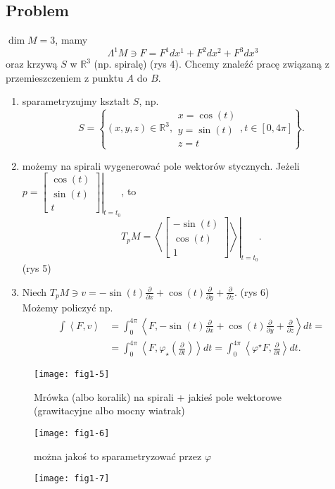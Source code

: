 \documentclass[../main.tex]{subfiles}
\begin{document}
\subsection{Problem}
$\dim M = 3$, mamy
 \[
\Lambda^1M\ni F = F^1dx^1 + F^2dx^2 + F^3dx^3
\]
oraz krzywą $S$ w $\mathbb{R}^3$ (np. spiralę) (rys 4). Chcemy znaleźć pracę związaną z przemieszczeniem z punktu $A$ do $B$.
\begin{enumerate}
    \item sparametryzujmy kształt $S$, np.
        \[
            S = \left\{ (x,y,z)\in\mathbb{R}^3, \begin{matrix}x = \cos(t)\\ y = \sin(t)\\ z = t \end{matrix}, t\in \left[ 0, 4\pi \right] \right\}
        .\]
\item możemy na spirali wygenerować pole wektorów stycznych. Jeżeli $p = \left.\begin{bmatrix} \cos(t)\\ \sin(t)\\ t \end{bmatrix}\right|_{t = t_0} $, to
        \[
            T_pM = \left.\left<\begin{bmatrix} -\sin(t)\\ \cos(t)\\ 1 \end{bmatrix}  \right>\right|_{t = t_0}
                .\] (rys 5)
        \item Niech $T_pM \ni v = -\sin(t) \frac{\partial }{\partial x} + \cos(t) \frac{\partial }{\partial y} + \frac{\partial }{\partial z}$. (rys 6)\\
            Możemy policzyć np.
            \begin{align*}
                \int \left<F, v \right> &= \int_{0}^{4\pi} \left<F, -\sin(t)\frac{\partial }{\partial x} + \cos(t) \frac{\partial }{\partial y} + \frac{\partial }{\partial z}  \right> dt = \\
                &= \int_{0}^{4\pi} \left<F, \varphi_\star\left(\frac{\partial }{\partial t} \right) \right>dt = \int_0^{4\pi} \left<\varphi^\star F, \frac{\partial }{\partial t}  \right>dt
            .\end{align*}
\end{enumerate}
\begin{figure}[h]
    \centering
    \texttt{[image: fig1-5]}
    \caption{Mrówka (albo koralik) na spirali + jakieś pole wektorowe (grawitacyjne albo mocny wiatrak)}
    \label{fig:fig1-5}
\end{figure}
\begin{figure}[h]
    \centering
    \texttt{[image: fig1-6]}
    \caption{można jakoś to sparametryzować przez $\varphi$}
    \label{fig:fig1-6}
\end{figure}
\begin{figure}[h]
    \centering
    \texttt{[image: fig1-7]}
    \caption{}
    \label{fig:fig1-7}
\end{figure}
\end{document}
